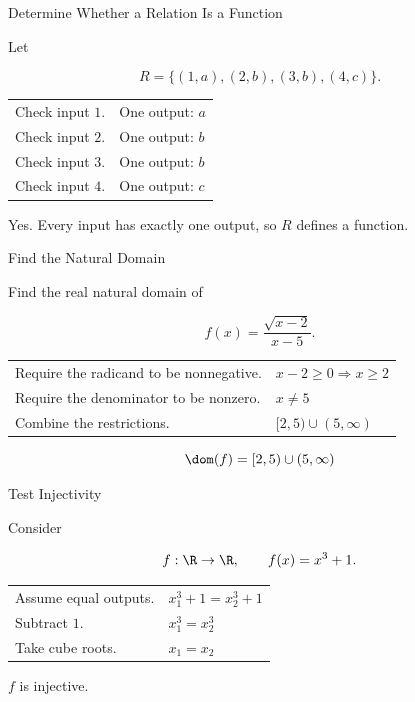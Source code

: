 \begin{workedexamplebox}{Determine Whether a Relation Is a Function}

Let

\[ R=\{(1,a),(2,b),(3,b),(4,c)\}. \]

\begin{tabularx}{\textwidth}{@{}>{\raggedright\arraybackslash}p{}X@{}}
Check input \(1\). & One output: \(a\)\\
Check input \(2\). & One output: \(b\)\\
Check input \(3\). & One output: \(b\)\\
Check input \(4\). & One output: \(c\)
\end{tabularx}

\begin{answerbox}
Yes. Every input has exactly one output, so \(R\) defines a function.
\end{answerbox}
\end{workedexamplebox}

\begin{workedexamplebox}{Find the Natural Domain}

Find the real natural domain of

\[ f(x)=\frac{\sqrt{x-2}}{x-5}. \]

\begin{tabularx}{\textwidth}{@{}>{\raggedright\arraybackslash}p{}X@{}}
Require the radicand to be nonnegative. & \(x-2\geq0\Rightarrow x\geq2\)\\
Require the denominator to be nonzero. & \(x\neq5\)\\
Combine the restrictions. & \([2,5)\cup(5,\infty)\)
\end{tabularx}

\begin{answerbox}
\[ \dom(f)=[2,5)\cup(5,\infty) \]
\end{answerbox}
\end{workedexamplebox}

\begin{workedexamplebox}{Test Injectivity}

Consider

\[ f:\R\to\R,\qquad f(x)=x^3+1. \]

\begin{tabularx}{\textwidth}{@{}>{\raggedright\arraybackslash}p{}X@{}}
Assume equal outputs. & \(x_1^3+1=x_2^3+1\)\\
Subtract \(1\). & \(x_1^3=x_2^3\)\\
Take cube roots. & \(x_1=x_2\)
\end{tabularx}

\begin{answerbox}
\(f\) is injective.
\end{answerbox}
\end{workedexamplebox}


